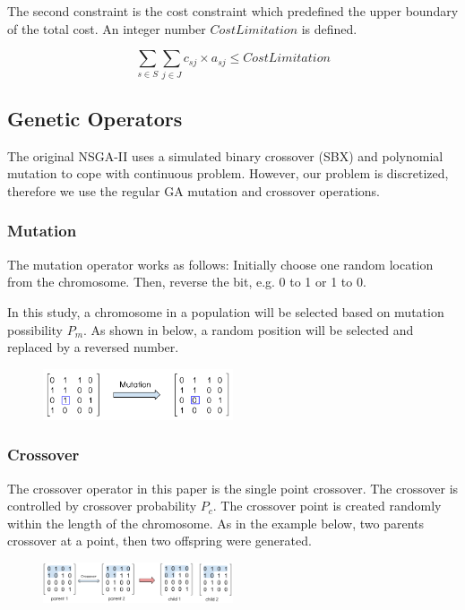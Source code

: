 \documentclass{llncs}
\begin{document}
The second constraint is the cost constraint which predefined the upper boundary of the total cost.
An integer number $CostLimitation$ is defined.
\begin{center}
	\begin{equation}
		\sum\limits_{s \in S} \sum\limits_{j \in J} c_{sj} \times a_{sj} \leq CostLimitation
	\end{equation}
\end{center}


\subsection{Genetic Operators}
\label{sec:operators}
 The original NSGA-II uses a simulated 
binary crossover (SBX) \cite{930314} and polynomial mutation \cite{Raghuwanshi04} to cope with continuous problem. 
However, our problem is discretized, therefore we use the regular GA mutation and crossover operations.


\subsubsection{Mutation}
The mutation operator works as follows: Initially choose one random location from the chromosome. 
Then, reverse the bit, e.g. 0 to 1 or 1 to 0. 

In this study, a chromosome in a population will be selected based on mutation possibility $P_{m}$. 
As shown in below, a random position will be selected and replaced by a reversed number.
\begin{figure}[ht]
\centering
	\includegraphics[width=0.5\textwidth]{pics/mutation.png}
\caption{}
\label{graph1}
\end{figure}
\subsubsection{Crossover}
The crossover operator in this paper is the single point crossover. 
The crossover is controlled by crossover probability $P_{c}$. 
The crossover point is created randomly within the length of the chromosome. 
As in the example below, two parents crossover at a point, then two offspring were generated.
\begin{figure}[ht]
\centering
	\includegraphics[width=0.5\textwidth]{pics/crossover.png}
\caption{}
\label{graph2}
\end{figure}
\end{document}

